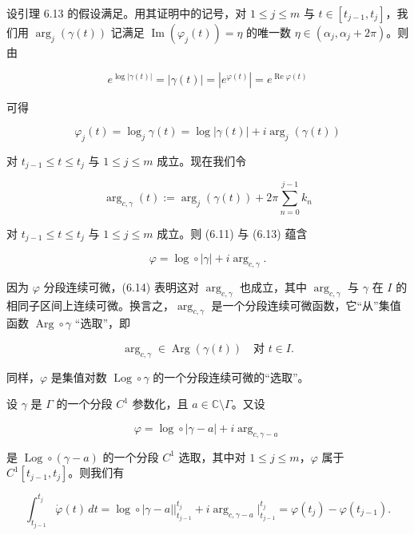 \begin{remark}

\begin{items}
\item

设引理 6.13 的假设满足。用其证明中的记号，对 $ 1 \le j \le m $ 与 $ t \in [t_{j-1},t_{j}] $，我们用 $ \arg_{j}(\gamma(t)) $ 记满足 $ \operatorname{Im}(\varphi_{j}(t)) = \eta $ 的唯一数 $ \eta \in (\alpha_{j},\alpha_{j} + 2\pi) $。则由

\[
e^{\log|\gamma(t)|} = |\gamma(t)| = |e^{\varphi(t)}| = e^{\operatorname{Re}\varphi(t)}
\]

可得

\begin{equation}
\varphi_{j}(t) = \log_{j}\gamma(t) = \log|\gamma(t)| + i\arg_{j}(\gamma(t))\tag{6.13}
\end{equation}

对 $ t_{j-1} \le t \le t_{j} $ 与 $ 1 \le j \le m $ 成立。现在我们令

\[
\arg_{c,\gamma}(t) := \arg_{j}(\gamma(t)) + 2\pi\sum_{n=0}^{j-1}k_{n}
\]

对 $ t_{j-1} \le t \le t_{j} $ 与 $ 1 \le j \le m $ 成立。则 (6.11) 与 (6.13) 蕴含

\begin{equation}
\varphi = \log\circ|\gamma| + i\arg_{c,\gamma} .\tag{6.14}
\end{equation}

因为 $ \varphi $ 分段连续可微，(6.14) 表明这对 $ \arg_{c,\gamma} $ 也成立，其中 $ \arg_{c,\gamma} $ 与 $ \gamma $ 在 $ I $ 的相同子区间上连续可微。换言之，$ \arg_{c,\gamma} $ 是一个分段连续可微函数，它“从”集值函数 $ \operatorname{Arg}\circ\gamma $ “选取”，即

\[
\arg_{c,\gamma} \in \operatorname{Arg}(\gamma(t)) \quad \text{对 } t \in I .
\]

同样，$ \varphi $ 是集值对数 $ \operatorname{Log}\circ\gamma $ 的一个分段连续可微的“选取”。

\item

设 $ \gamma $ 是 $ \Gamma $ 的一个分段 $ C^{1} $ 参数化，且 $ a \in \mathbb{C}\setminus\Gamma $。又设

\[
\varphi = \log\circ|\gamma - a| + i\arg_{c,\gamma-a}
\]

是 $ \operatorname{Log}\circ(\gamma - a) $ 的一个分段 $ C^{1} $ 选取，其中对 $ 1 \le j \le m $，$ \varphi $ 属于 $ C^{1}[t_{j-1},t_{j}] $。则我们有

\[
\int_{t_{j-1}}^{t_{j}}\dot\varphi(t)\,dt = \log\circ|\gamma - a|\big|_{t_{j-1}}^{t_{j}} + i\arg_{c,\gamma-a}\big|_{t_{j-1}}^{t_{j}} = \varphi(t_{j}) - \varphi(t_{j-1}) .
\]


\end{items}
\end{remark}
